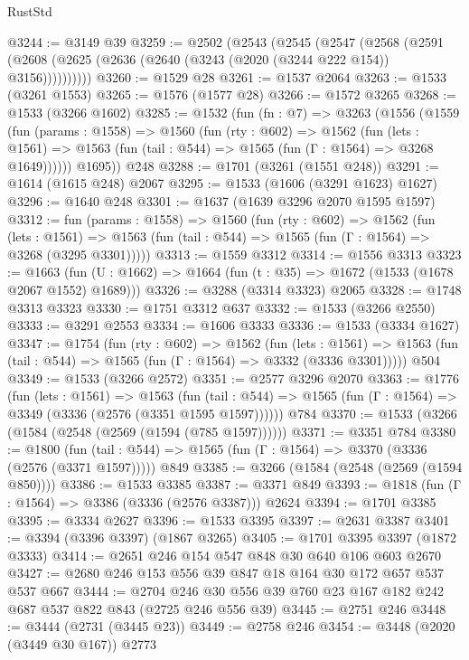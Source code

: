 \begin{lexlean}{RustStd}
\begin{coremodule}
@3244 := @3149 @39
@3259 := @2502
    (@2543
      (@2545
        (@2547
          (@2568 (@2591 (@2608 (@2625 (@2636 (@2640 (@3243 (@2020 (@3244 @222 @154)) @3156))))))))))
@3260 := @1529 @28
@3261 := @1537 @2064
@3263 := @1533 (@3261 @1553)
@3265 := @1576 (@1577 @28)
@3266 := @1572 @3265
@3268 := @1533 (@3266 @1602)
@3285 := @1532
    (fun (fn : @7) =>
    @3263
      (@1556
        (@1559
          (fun (params : @1558) =>
          @1560
            (fun (rty : @602) =>
            @1562
              (fun (lets : @1561) =>
              @1563 (fun (tail : @544) => @1565 (fun (Γ : @1564) => @3268 @1649))))))
        @1695))
    @248
@3288 := @1701 (@3261 (@1551 @248))
@3291 := @1614 (@1615 @248) @2067
@3295 := @1533 (@1606 (@3291 @1623) @1627)
@3296 := @1640 @248
@3301 := @1637 (@1639 @3296 @2070 @1595 @1597)
@3312 := fun (params : @1558) =>
  @1560
    (fun (rty : @602) =>
    @1562
      (fun (lets : @1561) =>
      @1563 (fun (tail : @544) => @1565 (fun (Γ : @1564) => @3268 (@3295 @3301)))))
@3313 := @1559 @3312
@3314 := @1556 @3313
@3323 := @1663 (fun (U : @1662) => @1664 (fun (t : @35) => @1672 (@1533 (@1678 @2067 @1552) @1689)))
@3326 := @3288 (@3314 @3323) @2065
@3328 := @1748 @3313 @3323
@3330 := @1751 @3312 @637
@3332 := @1533 (@3266 @2550)
@3333 := @3291 @2553
@3334 := @1606 @3333
@3336 := @1533 (@3334 @1627)
@3347 := @1754
    (fun (rty : @602) =>
    @1562
      (fun (lets : @1561) =>
      @1563 (fun (tail : @544) => @1565 (fun (Γ : @1564) => @3332 (@3336 @3301)))))
    @504
@3349 := @1533 (@3266 @2572)
@3351 := @2577 @3296 @2070
@3363 := @1776
    (fun (lets : @1561) =>
    @1563
      (fun (tail : @544) => @1565 (fun (Γ : @1564) => @3349 (@3336 (@2576 (@3351 @1595 @1597))))))
    @784
@3370 := @1533 (@3266 (@1584 (@2548 (@2569 (@1594 (@785 @1597))))))
@3371 := @3351 @784
@3380 := @1800
    (fun (tail : @544) => @1565 (fun (Γ : @1564) => @3370 (@3336 (@2576 (@3371 @1597)))))
    @849
@3385 := @3266 (@1584 (@2548 (@2569 (@1594 @850))))
@3386 := @1533 @3385
@3387 := @3371 @849
@3393 := @1818 (fun (Γ : @1564) => @3386 (@3336 (@2576 @3387))) @2624
@3394 := @1701 @3385
@3395 := @3334 @2627
@3396 := @1533 @3395
@3397 := @2631 @3387
@3401 := @3394 (@3396 @3397) (@1867 @3265)
@3405 := @1701 @3395 @3397 (@1872 @3333)
@3414 := @2651 @246 @154 @547 @848 @30 @640 @106 @603 @2670
@3427 := @2680 @246 @153 @556 @39 @847 @18 @164 @30 @172 @657 @537 @537 @667
@3444 := @2704 @246 @30 @556 @39 @760 @23 @167 @182 @242 @687 @537 @822 @843 (@2725 @246 @556 @39)
@3445 := @2751 @246
@3448 := @3444 (@2731 (@3445 @23))
@3449 := @2758 @246
@3454 := @3448 (@2020 (@3449 @30 @167)) @2773

\end{coremodule}
\end{lexlean}
